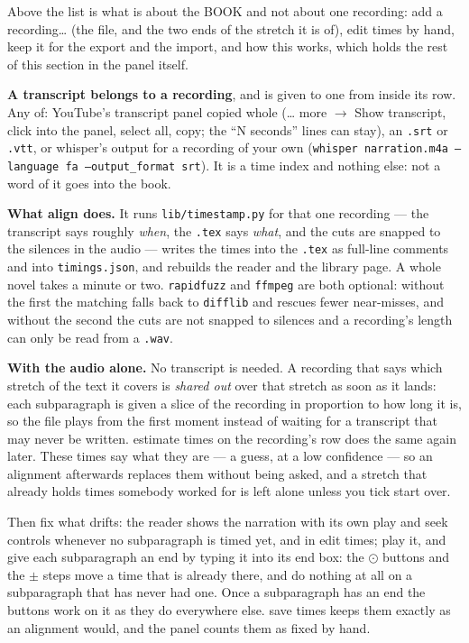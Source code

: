 \documentclass[11pt,oneside]{report}
\newcommand{\file}[1]{\texttt{#1}}
\newcommand{\menu}[1]{\textsf{#1}}
\begin{document}
\noindent Above the list is what is about the BOOK and not about one
recording: \menu{add a recording\ldots} (the file, and the two ends of the
stretch it is of), \menu{edit times by hand}, \menu{keep it} for the export
and the import, and \menu{how this works}, which holds the rest of this
section in the panel itself.

\textbf{A transcript belongs to a recording}, and is given to one from inside
its row. Any of: YouTube's transcript panel copied whole (\menu{\ldots{} more}
$\rightarrow$ \menu{Show transcript}, click into the panel, select all, copy;
the ``N seconds'' lines can stay), an \file{.srt} or \file{.vtt}, or whisper's
output for a recording of your own (\texttt{whisper narration.m4a --language
fa --output\_format srt}). It is a time index and nothing else: not a word of
it goes into the book.

\textbf{What \menu{align} does.} It runs \file{lib/timestamp.py} for that one
recording --- the transcript says roughly \emph{when}, the \file{.tex} says
\emph{what}, and the cuts are snapped to the silences in the audio --- writes
the times into the \file{.tex} as full-line comments and into
\file{timings.json}, and rebuilds the reader and the library page. A whole
novel takes a minute or two. \texttt{rapidfuzz} and \texttt{ffmpeg} are both
optional: without the first the matching falls back to \texttt{difflib} and
rescues fewer near-misses, and without the second the cuts are not snapped to
silences and a recording's length can only be read from a \file{.wav}.

\textbf{With the audio alone.} No transcript is needed. A recording that says
which stretch of the text it covers is \emph{shared out} over that stretch as
soon as it lands: each subparagraph is given a slice of the recording in
proportion to how long it is, so the file plays from the first moment instead
of waiting for a transcript that may never be written. \menu{estimate times}
on the recording's row does the same again later. These times say what they
are --- a guess, at a low confidence --- so an alignment afterwards replaces
them without being asked, and a stretch that already holds times somebody
worked for is left alone unless you tick \menu{start over}.

Then fix what drifts: the reader shows the narration with its own play and
seek controls whenever no subparagraph is timed yet, and in \menu{edit times}; play it,
and give each subparagraph an end by typing it into its \textsf{end} box:
the $\odot$ buttons and the $\pm$ steps move a time that is already there,
and do nothing at all on a subparagraph that has never had one. Once a
subparagraph has an end the buttons work on it as they do everywhere else.
\menu{save times} keeps them exactly as an alignment would, and the panel
counts them as fixed by hand.
\end{document}
